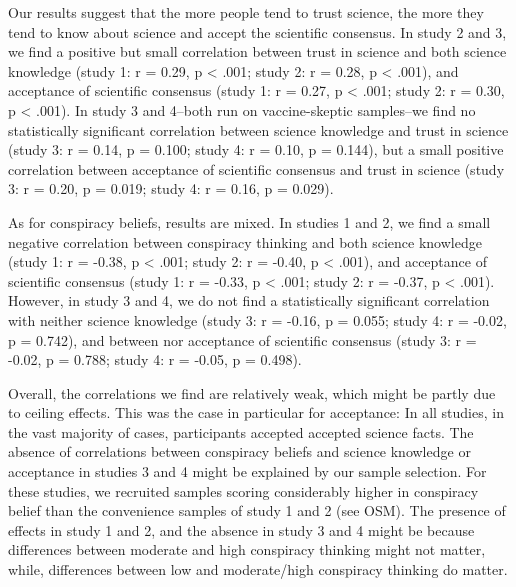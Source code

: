 \documentclass[
  doc,floatsintext]{apa6}
\begin{document}
Our results suggest that the more people tend to trust science, the more they tend to know about science and accept the scientific consensus. In study 2 and 3, we find a positive but small correlation between trust in science and both science knowledge (study 1: r = 0.29, p \textless{} .001; study 2: r = 0.28, p \textless{} .001), and acceptance of scientific consensus (study 1: r = 0.27, p \textless{} .001; study 2: r = 0.30, p \textless{} .001). In study 3 and 4--both run on vaccine-skeptic samples--we find no statistically significant correlation between science knowledge and trust in science (study 3: r = 0.14, p = 0.100; study 4: r = 0.10, p = 0.144), but a small positive correlation between acceptance of scientific consensus and trust in science (study 3: r = 0.20, p = 0.019; study 4: r = 0.16, p = 0.029).

As for conspiracy beliefs, results are mixed. In studies 1 and 2, we find a small negative correlation between conspiracy thinking and both science knowledge (study 1: r = -0.38, p \textless{} .001; study 2: r = -0.40, p \textless{} .001), and acceptance of scientific consensus (study 1: r = -0.33, p \textless{} .001; study 2: r = -0.37, p \textless{} .001). However, in study 3 and 4, we do not find a statistically significant correlation with neither science knowledge (study 3: r = -0.16, p = 0.055; study 4: r = -0.02, p = 0.742), and between nor acceptance of scientific consensus (study 3: r = -0.02, p = 0.788; study 4: r = -0.05, p = 0.498).

Overall, the correlations we find are relatively weak, which might be partly due to ceiling effects. This was the case in particular for acceptance: In all studies, in the vast majority of cases, participants accepted accepted science facts. The absence of correlations between conspiracy beliefs and science knowledge or acceptance in studies 3 and 4 might be explained by our sample selection. For these studies, we recruited samples scoring considerably higher in conspiracy belief than the convenience samples of study 1 and 2 (see OSM). The presence of effects in study 1 and 2, and the absence in study 3 and 4 might be because differences between moderate and high conspiracy thinking might not matter, while, differences between low and moderate/high conspiracy thinking do matter.
\end{document}
